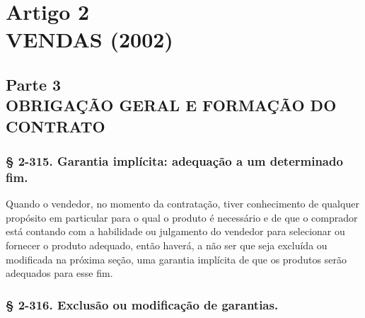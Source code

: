 \documentclass[a5paper,10pt]{book}
\begin{document}
\part[Artigo 2 -- VENDAS (2002)]{Artigo 2\\ VENDAS (2002)}

\chapter[Parte 3 -- OBRIGAÇÃO GERAL E FORMAÇÃO DO CONTRATO]{Parte 3\\ OBRIGAÇÃO GERAL E FORMAÇÃO DO CONTRATO}

\section{§ 2-315. Garantia implícita: adequação a um determinado fim.}

Quando o vendedor, no momento da contratação, tiver conhecimento de qualquer propósito em particular para o qual o produto é necessário e de que o comprador está contando com a habilidade ou julgamento do vendedor para selecionar ou fornecer o produto adequado, então haverá, a não ser que seja excluída ou modificada na próxima seção, uma garantia implícita de que os produtos serão adequados para esse fim.

\section{§ 2-316. Exclusão ou modificação de garantias.}
\end{document}
